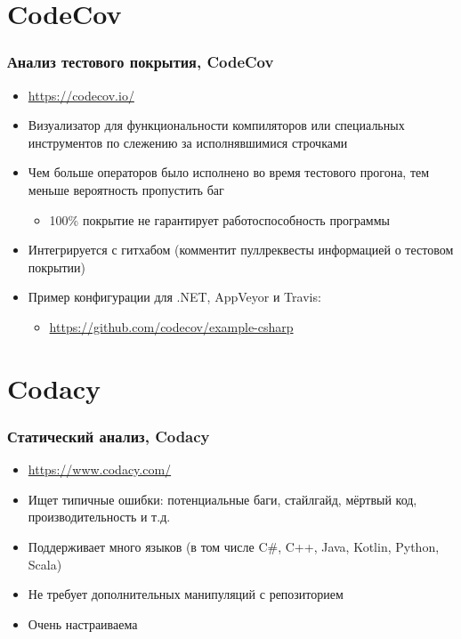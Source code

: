 \documentclass[xetex,mathserif,serif]{beamer}
\begin{document}
    \section{CodeCov}

    \begin{frame}
        \frametitle{Анализ тестового покрытия, CodeCov}
        \begin{itemize}
            \item \url{https://codecov.io/}
            \item Визуализатор для функциональности компиляторов или специальных инструментов по слежению за исполнявшимися строчками
            \item Чем больше операторов было исполнено во время тестового прогона, тем меньше вероятность пропустить баг
            \begin{itemize}
                \item 100\% покрытие не гарантирует работоспособность программы
            \end{itemize}
            \item Интегрируется с гитхабом (комментит пуллреквесты информацией о тестовом покрытии)
            \item Пример конфигурации для .NET, AppVeyor и Travis:
            \begin{itemize}
                \item \url{https://github.com/codecov/example-csharp}
            \end{itemize}
        \end{itemize}
    \end{frame}

    \section{Codacy}

    \begin{frame}
        \frametitle{Статический анализ, Codacy}
        \begin{itemize}
            \item \url{https://www.codacy.com/}
            \item Ищет типичные ошибки: потенциальные баги, стайлгайд, мёртвый код, производительность и т.д.
            \item Поддерживает много языков (в том числе C\#, C++, Java, Kotlin, Python, Scala)
            \item Не требует дополнительных манипуляций с репозиторием
            \item Очень настраиваема
        \end{itemize}
    \end{frame}
\end{document}
